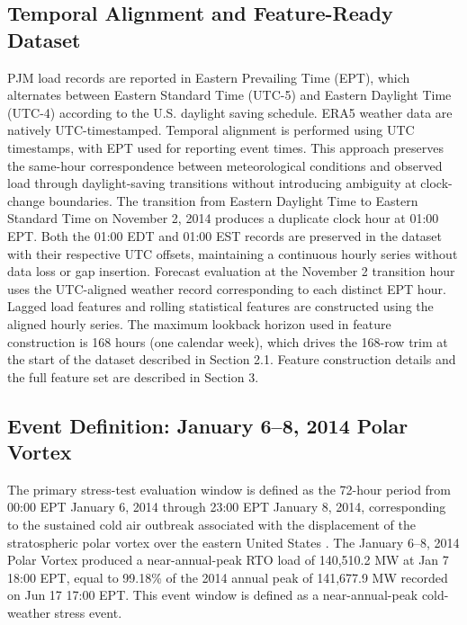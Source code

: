 \documentclass[12pt,a4paper]{article}
\begin{document}
\subsection{Temporal Alignment and Feature-Ready Dataset}
PJM load records are reported in Eastern Prevailing Time (EPT), which alternates between Eastern Standard Time (UTC-5) and Eastern Daylight Time (UTC-4) according to the U.S. daylight saving schedule. ERA5 weather data are natively UTC-timestamped. Temporal alignment is performed using UTC timestamps, with EPT used for reporting event times. This approach preserves the same-hour correspondence between meteorological conditions and observed load through daylight-saving transitions without introducing ambiguity at clock-change boundaries.
The transition from Eastern Daylight Time to Eastern Standard Time on November 2, 2014 produces a duplicate clock hour at 01:00 EPT. Both the 01:00 EDT and 01:00 EST records are preserved in the dataset with their respective UTC offsets, maintaining a continuous hourly series without data loss or gap insertion. Forecast evaluation at the November 2 transition hour uses the UTC-aligned weather record corresponding to each distinct EPT hour.
Lagged load features and rolling statistical features are constructed using the aligned hourly series. The maximum lookback horizon used in feature construction is 168 hours (one calendar week), which drives the 168-row trim at the start of the dataset described in Section 2.1. Feature construction details and the full feature set are described in Section 3.
\subsection{Event Definition: January 6--8, 2014 Polar Vortex}
The primary stress-test evaluation window is defined as the 72-hour period from 00:00 EPT January 6, 2014 through 23:00 EPT January 8, 2014, corresponding to the sustained cold air outbreak associated with the displacement of the stratospheric polar vortex over the eastern United States \cite{arritt2014us}. The January 6–8, 2014 Polar Vortex produced a near-annual-peak RTO load of 140,510.2 MW at Jan 7 18:00 EPT, equal to 99.18\% of the 2014 annual peak of 141,677.9 MW recorded on Jun 17 17:00 EPT.
This event window is defined as a near-annual-peak cold-weather stress event.
\end{document}
